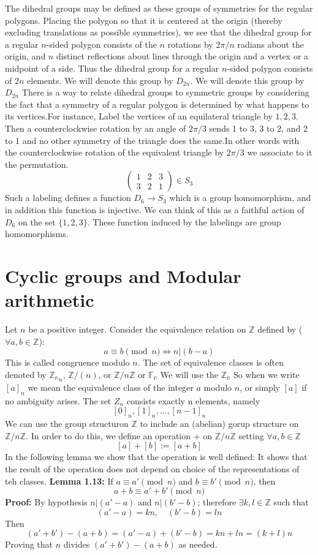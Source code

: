 The dihedral groups may be defined as these groups of symmetries for the regular polygons. Placing the polygon so that it is centered at the origin (thereby excluding translations as possible symmetries), we see that the dihedral group for a regular $n$-sided polygon consists of the $n$ rotations by $2\pi/n$ radians about the origin, and $n$ distinct reflections about lines through the origin and a vertex or a midpoint of a side. Thus the dihedral group for a regular $n$-sided polygon consists of $2n$ elements. We will denote this group by $D_{2n}$.
We will denote this group by $D_{2n}$
There is a way to relate dihedral groups to symmetric groups by considering the fact that a symmetry of a regular polygon is determined by what happens to its vertices.For instance, Label the vertices of an equilateral triangle by $1, 2, 3$. Then a counterclockwise rotation by an angle of $2\pi/3$ sends 1 to 3, 3 to 2, and 2 to 1 and no other symmetry of the triangle does the same.In other words with the counterclockwise rotation of the equivalent triangle by $2 \pi/3$ we associate to it the permutation.
$$ \begin{pmatrix} 1 & 2 & 3 \\ 3 & 2 & 1 \end{pmatrix} \in S_3 $$
Such a labeling defines a function $D_6 \longrightarrow S_3$ which is a group homomorphism, and in addition this function is injective. We can think of this as a faithful action of $D_6$ on the set $\{1,2,3\}$.
These function induced by the labelings are group homomorphisms.

\section*{Cyclic groups and Modular arithmetic}
Let $n$ be a positive integer. Consider the equivalence relation on $\mathbb{Z} $ defined by ($\forall a, b \in \mathbb{Z}$):
$$ a \equiv b \pmod n \iff n | (b - a) $$
This is called congruence modulo $n$.
The set of equivalence classes is often denoted by $\mathbb{Z_n}_n$, $\mathbb{Z}/(n)$, or $\mathbb{Z}/n\mathbb{Z}$ or $\mathbb{F_n}$
We will use the $\mathbb{Z_n}$
So when we write $[a]_n$ we mean the equivalence class of the integer $a$ modulo $n$, or simply $[a]$ if no ambiguity arises.
The set $Z_n$ consists exactly n elements, namely
$$[0]_n, [1]_n,...,[n-1]_n$$
We can use the group structuron $\mathbb{Z}$ to include an (abelian) gorup structure on $\mathbb{Z}/n\mathbb{Z}$. In order to do this, we define an operation  + on $\mathbb{Z}/n\mathbb{Z}$ setting $\forall a,b \in \mathbb{Z}$
$$[a] + [b] := [a+b]$$
In the following lemma we show that the operation is well defined: It shows that the result of the operation does not depend on choice of the representations of teh classes.
\textbf{Lemma 1.13:} If $a \equiv a' \pmod n$ and $b \equiv b' \pmod n$, then
$$ a + b \equiv a' + b' \pmod n $$
\textbf{Proof:} By hypothesis $n | (a' - a)$ and $n | (b' - b)$; therefore $\exists k, l \in \mathbb{Z}$ such that
$$ (a' - a) = kn, \quad (b' - b) = ln $$
Then
$$ (a' + b') - (a + b) = (a' - a) + (b' - b) = kn + ln = (k + l)n $$
Proving that $n$ divides $(a' + b') - (a + b)$ as needed.


